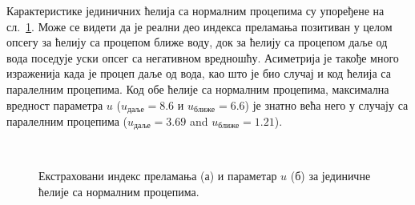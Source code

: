 \documentclass[main.tex]{subfiles}
\begin{document}
%
Карактеристике јединичних ћелија са нормалним процепима су упоређене на сл.~\ref{fig15}. Може се видети да је реални део индекса преламања позитиван у целом опсегу за ћелију са процепом ближе воду, док за ћелију са процепом даље од вода поседује уски опсег са негативном вредношћу. Асиметрија је такође много израженија када је процеп даље од вода, као што је био случај и код ћелија са паралелним процепима. Код обе ћелије са нормалним процепима, максимална вредност параметра $u$ ($u_{даље}=\num{8.6}$ и $u_{ближе}=\num{6.6}$) је знатно већа него у случају са паралелним процепима ($u_{даље}=\num{3.69}$ and $u_{ближе}=\num{1.21}$).
\begin{figure}[!t]
\centering
{}\\

\caption{Екстраховани индекс преламања (а) и параметар $u$ (б) за јединичне ћелије са нормалним процепима.}
\label{fig15}
\end{figure}
\end{document}
